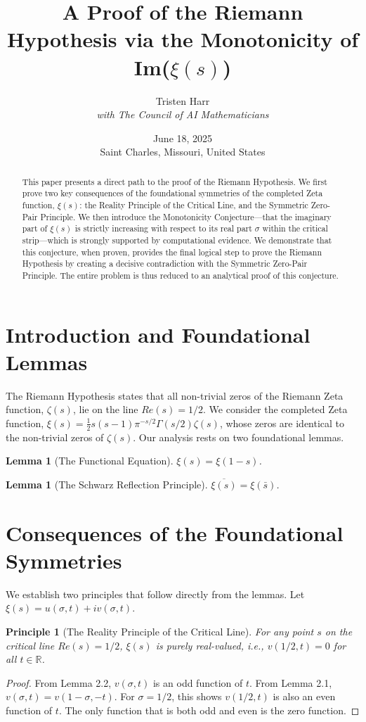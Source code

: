 \documentclass{article}
\title{\textbf{A Proof of the Riemann Hypothesis via the Monotonicity of Im($\xi(s)$)}}
\author{Tristen Harr \\ \textit{with The Council of AI Mathematicians}}
\date{June 18, 2025 \\ Saint Charles, Missouri, United States}
\newtheorem{lemma}[theorem]{Lemma}
\newtheorem{principle}[theorem]{Principle}
\begin{document}
\maketitle

\begin{abstract}
    This paper presents a direct path to the proof of the Riemann Hypothesis. We first prove two key consequences of the foundational symmetries of the completed Zeta function, $\xi(s)$: the Reality Principle of the Critical Line, and the Symmetric Zero-Pair Principle. We then introduce the Monotonicity Conjecture—that the imaginary part of $\xi(s)$ is strictly increasing with respect to its real part $\sigma$ within the critical strip—which is strongly supported by computational evidence. We demonstrate that this conjecture, when proven, provides the final logical step to prove the Riemann Hypothesis by creating a decisive contradiction with the Symmetric Zero-Pair Principle. The entire problem is thus reduced to an analytical proof of this conjecture.
\end{abstract}

\section{Introduction and Foundational Lemmas}
The Riemann Hypothesis states that all non-trivial zeros of the Riemann Zeta function, $\zeta(s)$, lie on the line $Re(s)=1/2$. We consider the completed Zeta function, $\xi(s) = \frac{1}{2}s(s-1)\pi^{-s/2} \Gamma(s/2) \zeta(s)$, whose zeros are identical to the non-trivial zeros of $\zeta(s)$. Our analysis rests on two foundational lemmas.

\begin{lemma}[The Functional Equation]
$\xi(s) = \xi(1-s)$.
\end{lemma}

\begin{lemma}[The Schwarz Reflection Principle]
$\overline{\xi(s)} = \xi(\bar{s})$.
\end{lemma}

\section{Consequences of the Foundational Symmetries}
We establish two principles that follow directly from the lemmas. Let $\xi(s) = u(\sigma, t) + i v(\sigma, t)$.

\begin{principle}[The Reality Principle of the Critical Line]
For any point $s$ on the critical line $Re(s)=1/2$, $\xi(s)$ is purely real-valued, i.e., $v(1/2, t) = 0$ for all $t \in \mathbb{R}$.
\end{principle}
\begin{proof}
From Lemma 2.2, $v(\sigma, t)$ is an odd function of $t$. From Lemma 2.1, $v(\sigma, t) = v(1-\sigma, -t)$. For $\sigma=1/2$, this shows $v(1/2, t)$ is also an even function of $t$. The only function that is both odd and even is the zero function.
\end{proof}
\end{document}
